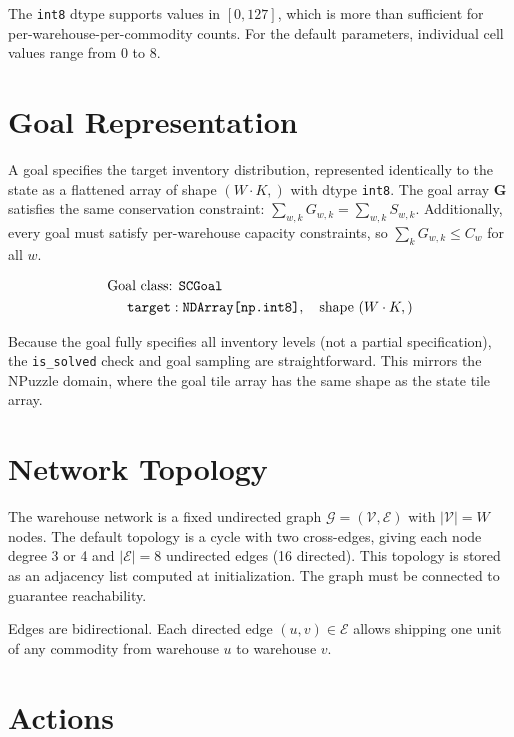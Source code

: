 \documentclass[11pt]{article}
\begin{document}
The \texttt{int8} dtype supports values in $[0, 127]$, which is more than sufficient for per-warehouse-per-commodity counts. For the default parameters, individual cell values range from 0 to 8.

\section{Goal Representation}

A goal specifies the target inventory distribution, represented identically to the state as a flattened array of shape $(W \cdot K,)$ with dtype \texttt{int8}. The goal array $\mathbf{G}$ satisfies the same conservation constraint: $\sum_{w,k} G_{w,k} = \sum_{w,k} S_{w,k}$. Additionally, every goal must satisfy per-warehouse capacity constraints, so $\sum_k G_{w,k} \leq C_w$ for all $w$.

\begin{align}
    \text{Goal class: } & \texttt{SCGoal} \notag \\
    \texttt{target}: & \; \texttt{NDArray[np.int8]}, \quad \text{shape } (W \cdot K,) \notag
\end{align}

Because the goal fully specifies all inventory levels (not a partial specification), the \texttt{is\_solved} check and goal sampling are straightforward. This mirrors the NPuzzle domain, where the goal tile array has the same shape as the state tile array.

\section{Network Topology}

The warehouse network is a fixed undirected graph $\mathcal{G} = (\mathcal{V}, \mathcal{E})$ with $|\mathcal{V}| = W$ nodes. The default topology is a cycle with two cross-edges, giving each node degree 3 or 4 and $|\mathcal{E}| = 8$ undirected edges (16 directed). This topology is stored as an adjacency list computed at initialization. The graph must be connected to guarantee reachability.

Edges are bidirectional. Each directed edge $(u, v) \in \mathcal{E}$ allows shipping one unit of any commodity from warehouse $u$ to warehouse $v$.

\section{Actions}
\end{document}
